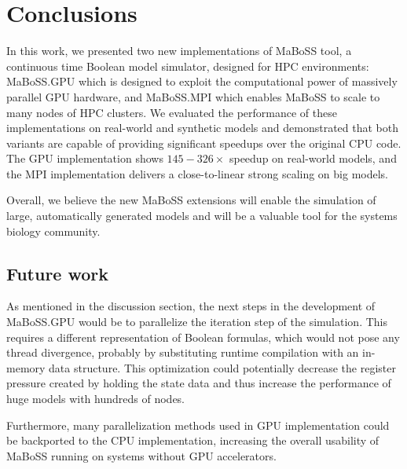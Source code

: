 \documentclass[times, twoside]{zHenriquesLab-StyleBioRxiv}
\begin{document}


\section*{Conclusions}

In this work, we presented two new implementations of MaBoSS tool, a continuous time Boolean model simulator, designed for HPC environments:  MaBoSS.GPU which is designed to exploit the computational power of massively parallel GPU hardware, and MaBoSS.MPI which enables MaBoSS to scale to many nodes of HPC clusters. We evaluated the performance of these implementations on real-world and synthetic models and demonstrated that both variants are capable of providing significant speedups over the original CPU code. The GPU implementation shows $145-326\times$ speedup on real-world models, and the MPI implementation delivers a close-to-linear strong scaling on big models.

Overall, we believe the new MaBoSS extensions will enable the simulation of large, automatically generated models and will be a valuable tool for the systems biology community.

\subsection*{Future work} 

As mentioned in the discussion section, the next steps in the development of MaBoSS.GPU would be to parallelize the iteration step of the simulation. This requires a different representation of Boolean formulas, which would not pose any thread divergence, probably by substituting runtime compilation with an in-memory data structure. This optimization could potentially decrease the register pressure created by holding the state data and thus increase the performance of huge models with hundreds of nodes.

Furthermore, many parallelization methods used in GPU implementation could be backported to the CPU implementation, increasing the overall usability of MaBoSS running on systems without GPU accelerators. 
\end{document}

